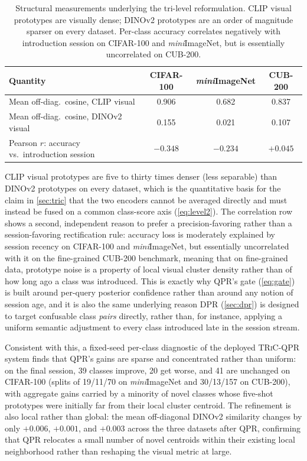 \documentclass{iutbscthesis}
\begin{document}
\begin{table}[H]
    \centering
    \begin{tabular}{l c c c}
        \toprule
        Quantity & CIFAR-100 & \emph{mini}ImageNet & CUB-200 \\
        \midrule
        Mean off-diag.\ cosine, CLIP visual & 0.906 & 0.682 & 0.837 \\
        Mean off-diag.\ cosine, DINOv2 visual & 0.155 & 0.021 & 0.107 \\
        Pearson $r$: accuracy vs.\ introduction session & $-0.348$ & $-0.234$ & $+0.045$ \\
        \bottomrule
    \end{tabular}
    \caption{Structural measurements underlying the tri-level reformulation. CLIP visual prototypes are visually dense; DINOv2 prototypes are an order of magnitude sparser on every dataset. Per-class accuracy correlates negatively with introduction session on CIFAR-100 and \emph{mini}ImageNet, but is essentially uncorrelated on CUB-200.}
    \label{tab:protodensity}
\end{table}

CLIP visual prototypes are five to thirty times denser (less separable) than DINOv2 prototypes on every dataset, which is the quantitative basis for the claim in \autoref{sec:tric} that the two encoders cannot be averaged directly and must instead be fused on a common class-score axis (\autoref{eq:level2}). The correlation row shows a second, independent reason to prefer a precision-favoring rather than a session-favoring rectification rule: accuracy loss is moderately explained by session recency on CIFAR-100 and \emph{mini}ImageNet, but essentially uncorrelated with it on the fine-grained CUB-200 benchmark, meaning that on fine-grained data, prototype noise is a property of local visual cluster density rather than of how long ago a class was introduced. This is exactly why QPR's gate (\autoref{eq:gate}) is built around per-query posterior confidence rather than around any notion of session age, and it is also the same underlying reason DPR (\autoref{sec:dpr}) is designed to target confusable class \emph{pairs} directly, rather than, for instance, applying a uniform semantic adjustment to every class introduced late in the session stream.

Consistent with this, a fixed-seed per-class diagnostic of the deployed \textsc{TRiC}-QPR system finds that QPR's gains are sparse and concentrated rather than uniform: on the final session, 39 classes improve, 20 get worse, and 41 are unchanged on CIFAR-100 (splits of 19/11/70 on \emph{mini}ImageNet and 30/13/157 on CUB-200), with aggregate gains carried by a minority of novel classes whose five-shot prototypes were initially far from their local cluster centroid. The refinement is also local rather than global: the mean off-diagonal DINOv2 similarity changes by only $+0.006$, $+0.001$, and $+0.003$ across the three datasets after QPR, confirming that QPR relocates a small number of novel centroids within their existing local neighborhood rather than reshaping the visual metric at large.
\end{document}
